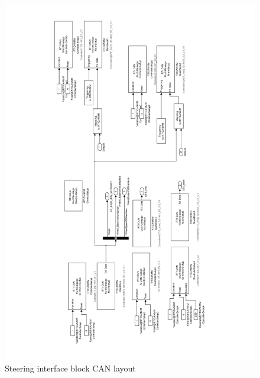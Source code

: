 \documentclass[ExampleMasters.tex]{subfiles}
\begin{document}
 \begin{figure}[!p]
 	\centering
 	\includegraphics[width=0.95\linewidth]{figures/steering_interface_inside}
 	
 	\caption[Steering interface block \acrshort{CAN} layout]{Steering interface block \gls{CAN} layout}
 	\label{fig:steering_interface_inside_pdf}
 \end{figure}
 
\end{document}
